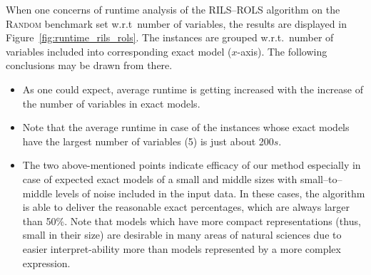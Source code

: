 \documentclass[a4paper,12pt]{elsarticle}
\begin{document}
When one concerns of runtime analysis of the \textsc{RILS}--\textsc{ROLS} algorithm on the \textsc{Random} benchmark set w.r.t\ number of variables, the results are displayed in Figure~\ref{fig:runtime_rils_rols}. The instances are grouped w.r.t.\ number of variables included into corresponding exact model ($x$-axis). The following conclusions may be drawn from there.  

\begin{itemize}
	\item As one could expect, average runtime is getting increased with the increase of the number of variables in exact models. 
	\item Note that the average runtime in case of the instances whose exact models have the largest number of variables (5) is just about 200$s$.
	\item The two above-mentioned points indicate efficacy of our method especially in case of expected exact models of a small and middle sizes with small--to--middle levels of noise included in the input data. In these cases, the algorithm is able to deliver the reasonable exact percentages, which are always larger than 50\%. Note that models which have more compact representations (thus, small in their size) are desirable in many areas of natural sciences due to easier interpret-ability more than models represented by a more complex expression.   
\end{itemize}
\end{document}
